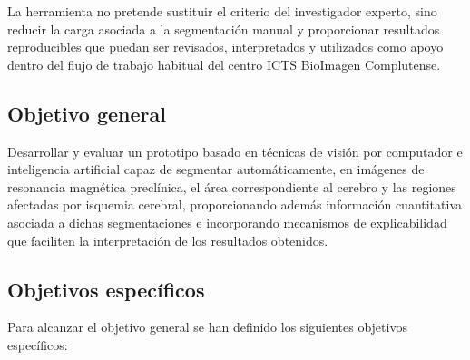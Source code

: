 La herramienta no pretende sustituir el criterio del investigador experto, sino reducir la carga asociada a la segmentación manual y proporcionar resultados reproducibles que puedan ser revisados, interpretados y utilizados como apoyo dentro del flujo de trabajo habitual del centro ICTS BioImagen Complutense.

\subsection{Objetivo general}

Desarrollar y evaluar un prototipo basado en técnicas de visión por computador e inteligencia artificial capaz de segmentar automáticamente, en imágenes de resonancia magnética preclínica, el área correspondiente al cerebro y las regiones afectadas por isquemia cerebral, proporcionando además información cuantitativa asociada a dichas segmentaciones e incorporando mecanismos de explicabilidad que faciliten la interpretación de los resultados obtenidos.

\subsection{Objetivos específicos}

Para alcanzar el objetivo general se han definido los siguientes objetivos específicos:

